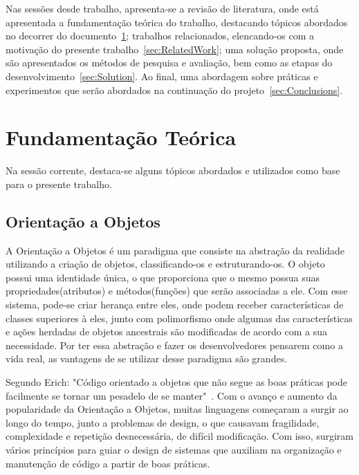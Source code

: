 \documentclass[11pt,a4paper,usenames,dvipsnames]{article}
\begin{document}
Nas sessões desde trabalho, apresenta-se a revisão de literatura, onde está apresentada a fundamentação teórica do trabalho, destacando tópicos abordados no decorrer do documento~\ref{sec:Literature}; trabalhos relacionados, elencando-os com a motivação do presente trabalho~\ref{sec:RelatedWork}; uma solução proposta, onde são apresentados os métodos de pesquisa e avaliação, bem como as etapas do desenvolvimento~\ref{sec:Solution}. Ao final, uma abordagem sobre práticas e experimentos que serão abordados na continuação do projeto~\ref{sec:Conclusions}. 


\section{Fundamentação Teórica}\label{sec:Literature}

Na sessão corrente, destaca-se alguns tópicos abordados e utilizados como base para o presente trabalho.

\subsection{Orientação a Objetos}
A Orientação a Objetos é um paradigma que consiste na abstração da realidade utilizando a criação de objetos, classificando-os e estruturando-os. O objeto possui uma identidade única, o que proporciona que o mesmo possua suas propriedades(atributos) e métodos(funções) que serão associadas a ele. Com esse sistema, pode-se criar herança entre eles, onde podem receber características de classes superiores à eles, junto com polimorfismo onde algumas das características e ações herdadas de objetos ancestrais são modificadas de acordo com a sua necessidade. 
Por ter essa abstração e fazer os desenvolvedores pensarem como a vida real, as vantagens de se utilizar desse paradigma são grandes. 

Segundo Erich: "Código orientado a objetos que não segue as boas práticas pode facilmente se tornar um pesadelo de se manter"~\cite{gamma1995design}. Com o avanço e aumento da popularidade da Orientação a Objetos, muitas linguagens começaram a surgir ao longo do tempo, junto a problemas de design, o que causavam fragilidade, complexidade e repetição desnecessária, de difícil modificação. Com isso, surgiram vários princípios para guiar o design de sistemas que auxiliam na organização e manutenção de código a partir de boas práticas. 
\end{document}
